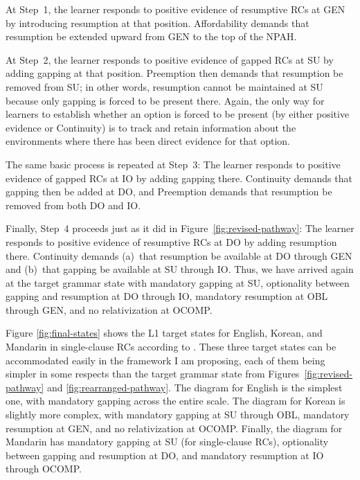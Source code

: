 At Step~1, the learner responds to positive evidence of resumptive RCs at GEN by introducing resumption at that position. Affordability demands that resumption be extended upward from GEN to the top of the NPAH.

At Step~2, the learner responds to positive evidence of gapped RCs at SU by adding gapping at that position. Preemption then demands that resumption be removed from SU; in other words, resumption cannot be maintained at SU because only gapping is forced to be present there. Again, the only way for learners to establish whether an option is forced to be present (by either positive evidence or Continuity) is to track and retain information about the environments where there has been direct evidence for that option.

The same basic process is repeated at Step~3: The learner responds to positive evidence of gapped RCs at IO by adding gapping there. Continuity demands that gapping then be added at DO, and Preemption demands that resumption be removed from both DO and IO.

Finally, Step~4 proceeds just as it did in Figure~\ref{fig:revised-pathway}: The learner responds to positive evidence of resumptive RCs at DO by adding resumption there. Continuity demands (a)~that resumption be available at DO through GEN and (b)~that gapping be available at SU through IO. Thus, we have arrived again at the target grammar state with mandatory gapping at SU, optionality between gapping and resumption at DO through IO, mandatory resumption at OBL through GEN, and no relativization at OCOMP.

Figure \ref{fig:final-states} shows the L1 target states for English, Korean, and Mandarin in single-clause RCs according to \textcite{keenan.comrie1977}. These three target states can be accommodated easily in the framework I am proposing, each of them being simpler in some respects than the target grammar state from Figures~\ref{fig:revised-pathway} and \ref{fig:rearranged-pathway}. The diagram for English is the simplest one, with mandatory gapping across the entire scale. The diagram for Korean is slightly more complex, with mandatory gapping at SU through OBL, mandatory resumption at GEN, and no relativization at OCOMP. Finally, the diagram for Mandarin has mandatory gapping at SU (for single-clause RCs), optionality between gapping and resumption at DO, and mandatory resumption at IO through OCOMP. 

